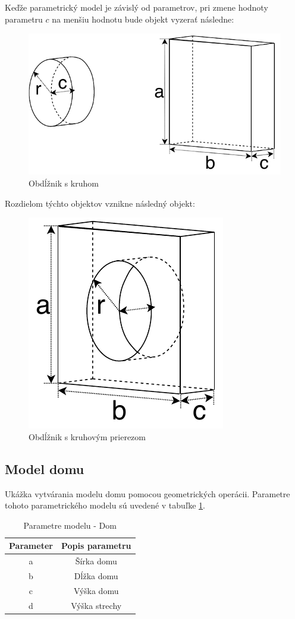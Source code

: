 Keďže parametrický model je závislý od parametrov, pri zmene hodnoty parametru $c$ na menšiu hodnotu bude objekt vyzerať následne:\nopagebreak
\begin{figure}[H]
	\centering
	\includegraphics[height=0.3\textwidth]{obrazky-figures/Examples/A3x.pdf}
	\caption{Obdĺžnik s kruhom}
	\label{fig:A3x}
\end{figure}
Rozdielom týchto objektov vznikne následný objekt:\nopagebreak
\begin{figure}[H]
	\centering
	\includegraphics[height=0.3\textwidth]{obrazky-figures/Examples/A4x.pdf}
	\caption{Obdĺžnik s kruhovým prierezom}
	\label{fig:A4x}
\end{figure}

\subsection*{Model domu}
Ukážka vytvárania modelu domu pomocou geometrických operácii. Parametre tohoto parametrického modelu sú uvedené v tabuľke \ref{tab:homeModel}.\nopagebreak
\begin{table}[H]
\centering
\begin{tabular}{ |c|c| }
 \hline
 Parameter & Popis parametru \\
 \hline
 \hline
 a & Šírka domu  \\ 
  \hline
 b & Dĺžka domu  \\  
  \hline
 c & Výška domu \\  
  \hline
 d & Výška strechy  \\
  \hline
\end{tabular}
\caption{Parametre modelu - Dom}
 \label{tab:homeModel}
\end{table}


